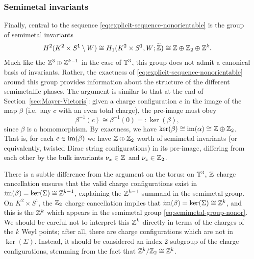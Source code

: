 \subsubsection{Semimetal invariants}

Finally, central to the sequence \eqref{eq:explicit-sequence-nonorientable} is the group of semimetal invariants
\begin{equation}\label{eq:semimetal-group-nonor}
	H^2(K^2\times S^1\setminus W)\cong H_1(K^2\times S^1, W; \widetilde{\mathbb{Z}})\cong \mathbb{Z}\oplus\mathbb{Z}_2\oplus\mathbb{Z}^k.
\end{equation}
Much like the $\mathbb{Z}^3\oplus\mathbb{Z}^{k-1}$ in the case of $\mathbb{T}^3$, this group does not admit a canonical basis of invariants. Rather, the exactness of \eqref{eq:explicit-sequence-nonorientable} around this group provides information about the structure of the different semimetallic phases. The argument is similar to that at the end of Section~\ref{sec:Mayer-Vietoris}: given a charge configuration $c$ in the image of the map $\beta$ (i.e.\ any $c$ with an even total charge), the pre-image must obey
\begin{equation*}
	\beta^{-1}(c) \cong \beta^{-1}(0) =: \ker(\beta),
\end{equation*}
since $\beta$ is a homomorphism. By exactness, we have $\ker(\beta)\cong\operatorname{im}(\alpha)\cong\mathbb{Z}\oplus\mathbb{Z}_2$. That is, for each $c\in\operatorname{im}(\beta)$ we have $\mathbb{Z}\oplus\mathbb{Z}_2$ worth of semimetal invariants (or equivalently, twisted Dirac string configurations) in its pre-image, differing from each other by the bulk invariants $\nu_x\in\mathbb{Z}$ and $\nu_z\in\mathbb{Z}_2$.

There is a subtle difference from the argument on the torus: on $\mathbb{T}^3$, $\mathbb{Z}$ charge cancellation ensures that the valid charge configurations exist in $\operatorname{im}(\beta)=\ker(\Sigma)\cong\mathbb{Z}^{k-1}$, explaining the $\mathbb{Z}^{k-1}$ summand in the semimetal group. On $K^2\times S^1$, the $\mathbb{Z}_2$ charge cancellation implies that $\operatorname{im}(\beta)=\ker(\Sigma)\cong\mathbb{Z}^k$, and this is the $\mathbb{Z}^k$ which appears in the semimetal group \eqref{eq:semimetal-group-nonor}. We should be careful not to interpret this $\mathbb{Z}^k$ directly in terms of the charges of the $k$ Weyl points; after all, there are charge configurations which are not in $\ker(\Sigma)$. Instead, it should be considered an index 2 subgroup of the charge configurations, stemming from the fact that $\mathbb{Z}^k/\mathbb{Z}_2\cong\mathbb{Z}^k$.

